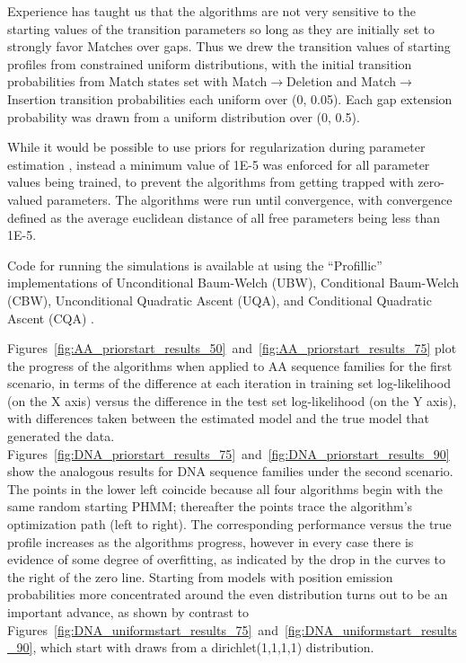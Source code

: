 \documentclass[preprint,12pt,authoryear]{elsarticle}
\begin{document}
Experience has taught us that the algorithms are not very sensitive to
the starting values of the transition parameters so long as they are
initially set to strongly favor Matches over gaps.  Thus we drew the
transition values of starting profiles from constrained uniform
distributions, with the initial transition probabilities from Match
states set with Match$\rightarrow$Deletion and Match$\rightarrow$Insertion transition probabilities each uniform over (0, 0.05).  Each gap extension
probability was drawn from a uniform distribution over (0, 0.5).

While it would be possible to use priors for regularization during parameter estimation \citep[treated as pseudocounts; see][]{edlefsen2010transposon}, instead a minimum value of 1E-5 was enforced for
all parameter values being trained, to prevent the algorithms from
getting trapped with zero-valued parameters.  The algorithms were run until convergence, with convergence defined as the average euclidean distance of all free parameters being less than 1E-5.

Code for running the simulations is available at \citep[url: ][]{ProfillicSimulation} using the ``Profillic'' implementations of Unconditional Baum-Welch (UBW), Conditional Baum-Welch (CBW), Unconditional Quadratic Ascent (UQA), and Conditional Quadratic Ascent (CQA) \citep[url: ][]{Profillic}.

Figures~\ref{fig:AA_priorstart_results_50}~and~\ref{fig:AA_priorstart_results_75} plot the progress of the algorithms when applied to AA sequence families for the first scenario, in terms of the difference at each iteration in training set log-likelihood (on the X axis) versus the difference in the test set log-likelihood (on the Y axis), with differences taken between the estimated model and the true model that generated the data.  Figures~\ref{fig:DNA_priorstart_results_75}~and~\ref{fig:DNA_priorstart_results_90} show the analogous results for DNA sequence families under the second scenario.  The points in the lower left coincide because all four algorithms begin with the same random starting PHMM; thereafter the points trace the algorithm's optimization path (left to right).  The corresponding performance versus the true profile increases as the algorithms progress, however in every case there is evidence of some degree of overfitting, as indicated by the drop in the curves to the right of the zero line.  Starting from models with position emission probabilities more concentrated around the even distribution turns out to be an important advance, as shown by contrast to Figures~\ref{fig:DNA_uniformstart_results_75}~and~\ref{fig:DNA_uniformstart_results_90}, which start with draws from a dirichlet(1,1,1,1) distribution.
\end{document}
